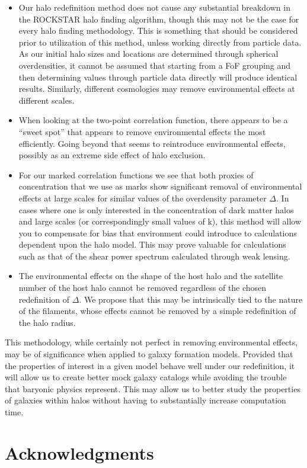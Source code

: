 \documentclass[usenatbib,usegraphicx,letterpaper]{mn2e}
\begin{document}
\begin{itemize}
	\item Our halo redefinition method does not cause any substantial breakdown in the ROCKSTAR halo finding algorithm, though this may not be the case for every halo finding methodology. This is something that should be considered prior to utilization of this method, unless working directly from particle data. As our initial halo sizes and locations are determined through spherical overdensities, it cannot be assumed that starting from a FoF grouping and then determining values through particle data directly will produce identical results. Similarly, different cosmologies may remove environmental effects at different scales.

	\item When looking at the two-point correlation function, there appears to be a ``sweet spot'' that appears to remove environmental effects the most efficiently. Going beyond that seems to reintroduce environmental effects, possibly as an extreme side effect of halo exclusion.

	\item For our marked correlation functions we see that both proxies of concentration that we use as marks show significant removal of environmental effects at large scales for similar values of the overdensity parameter $\Delta$. In cases where one is only interested in the concentration of dark matter halos and large scales (or correspondingly small values of k), this method will allow you to compensate for bias that environment could introduce to calculations dependent upon the halo model. This may prove valuable for calculations such as that of the shear power spectrum calculated through weak lensing.

	\item The environmental effects on the shape of the host halo and the satellite number of the host halo cannot be removed regardless of the chosen redefinition of $\Delta$. We propose that this may be intrinsically tied to the nature of the filaments, whose effects cannot be removed by a simple redefinition of the halo radius.
\end{itemize}

This methodology, while certainly not perfect in removing environmental effects, may be of significance when applied to galaxy formation models. Provided that the properties of interest in a given model behave well under our redefinition, it will allow us to create better mock galaxy catalogs while avoiding the trouble that baryonic physics represent. This may allow us to better study the properties of galaxies within halos without having to substantially increase computation time.

\section*{Acknowledgments}



\label{lastpage}
\end{document}
